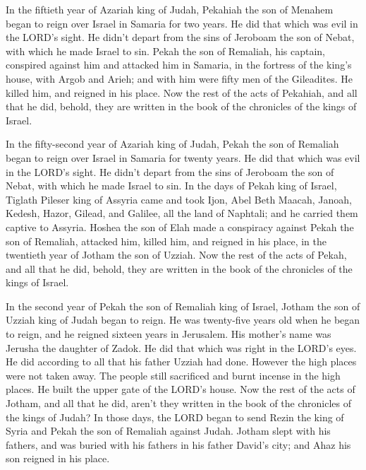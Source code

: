  In the fiftieth year of Azariah king of Judah, Pekahiah
the son of Menahem began to reign over Israel in Samaria for two years.
 He did that which was evil in the LORD's sight. He
didn't depart from the sins of Jeroboam the son of Nebat, with which he
made Israel to sin.  Pekah the son of Remaliah, his
captain, conspired against him and attacked him in Samaria, in the
fortress of the king's house, with Argob and Arieh; and with him were
fifty men of the Gileadites. He killed him, and reigned in his place.
 Now the rest of the acts of Pekahiah, and all that he
did, behold, they are written in the book of the chronicles of the kings
of Israel.

 In the fifty-second year of Azariah king of Judah, Pekah
the son of Remaliah began to reign over Israel in Samaria for twenty
years.  He did that which was evil in the LORD's sight.
He didn't depart from the sins of Jeroboam the son of Nebat, with which
he made Israel to sin.  In the days of Pekah king of
Israel, Tiglath Pileser king of Assyria came and took Ijon, Abel Beth
Maacah, Janoah, Kedesh, Hazor, Gilead, and Galilee, all the land of
Naphtali; and he carried them captive to Assyria.  Hoshea
the son of Elah made a conspiracy against Pekah the son of Remaliah,
attacked him, killed him, and reigned in his place, in the twentieth
year of Jotham the son of Uzziah.  Now the rest of the
acts of Pekah, and all that he did, behold, they are written in the book
of the chronicles of the kings of Israel.

 In the second year of Pekah the son of Remaliah king of
Israel, Jotham the son of Uzziah king of Judah began to reign.
 He was twenty-five years old when he began to reign, and
he reigned sixteen years in Jerusalem. His mother's name was Jerusha the
daughter of Zadok.  He did that which was right in the
LORD's eyes. He did according to all that his father Uzziah had done.
 However the high places were not taken away. The people
still sacrificed and burnt incense in the high places. He built the
upper gate of the LORD's house.  Now the rest of the acts
of Jotham, and all that he did, aren't they written in the book of the
chronicles of the kings of Judah?  In those days, the
LORD began to send Rezin the king of Syria and Pekah the son of Remaliah
against Judah.  Jotham slept with his fathers, and was
buried with his fathers in his father David's city; and Ahaz his son
reigned in his place.

